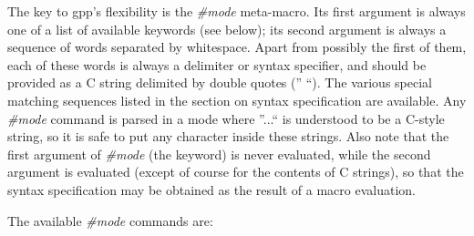 The key to gpp's flexibility is the {\it \#mode} meta-macro. Its first
argument is always one of a list of available keywords (see below); its second
argument is always a sequence of words separated by whitespace. Apart from
possibly the first of them, each of these words is always a delimiter or
syntax specifier, and should be provided as a C string delimited by double
quotes ('' ``). The various special matching sequences listed in the section
on syntax specification are available. Any {\it \#mode} command is parsed in a
mode where ''...`` is understood to be a C-style string, so it is safe to put
any character inside these strings. Also note that the first argument of {\it
\#mode} (the keyword) is never evaluated, while the second argument is
evaluated (except of course for the contents of C strings), so that the syntax
specification may be obtained as the result of a macro evaluation. 

The available {\it \#mode} commands are: 

